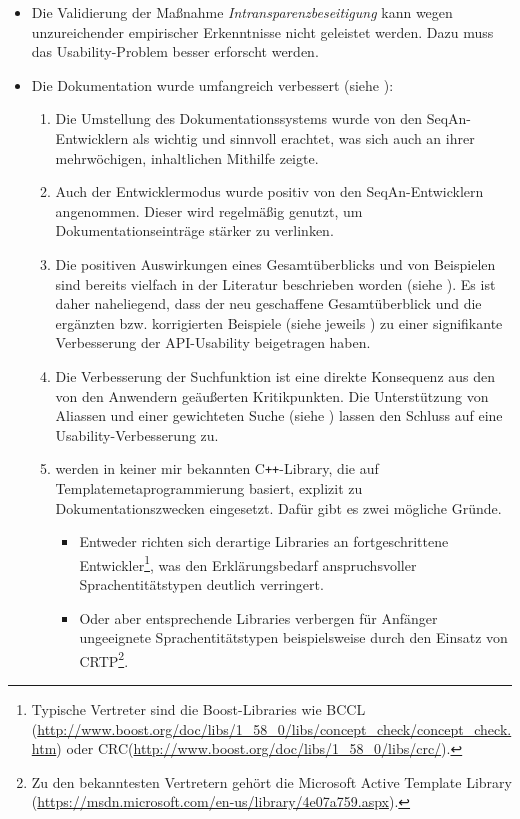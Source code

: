 \begin{itemize}
\begin{enumerate}
  \end{enumerate}
  \item Die Validierung der Maßnahme \textit{Intransparenzbeseitigung} kann wegen unzureichender empirischer Erkenntnisse nicht geleistet werden. Dazu muss das Usability-Problem  besser erforscht werden.
  \item Die Dokumentation wurde umfangreich verbessert (siehe ):
  \begin{enumerate}
    \item Die Umstellung des Dokumentationssystems wurde von den SeqAn-Entwicklern als wichtig und sinnvoll erachtet, was sich auch an ihrer mehrwöchigen, inhaltlichen Mithilfe zeigte.
    \item Auch der Entwicklermodus wurde positiv von den SeqAn-Entwicklern angenommen. Dieser wird regelmäßig genutzt, um Dokumentationseinträge stärker zu verlinken.
    \item Die positiven Auswirkungen eines Gesamtüberblicks und von Beispielen sind bereits vielfach in der Literatur beschrieben worden (siehe ). Es ist daher naheliegend, dass der neu geschaffene Gesamtüberblick und die ergänzten bzw. korrigierten Beispiele (siehe jeweils ) zu einer signifikante Verbesserung der API-Usability beigetragen haben.
    \item Die Verbesserung der Suchfunktion ist eine direkte Konsequenz aus den von den Anwendern geäußerten Kritikpunkten. Die Unterstützung von Aliassen und einer gewichteten Suche (siehe  ) lassen den Schluss auf eine Usability-Verbesserung zu.
    \item {} werden in keiner mir bekannten C\texttt{++}-Library, die auf Templatemetaprogrammierung basiert, explizit zu Dokumentationszwecken eingesetzt. Dafür gibt es zwei mögliche Gründe.
    \begin{itemize}
      \item Entweder richten sich derartige Libraries an fortgeschrittene Entwickler\footnote{Typische Vertreter sind die Boost-Libraries wie BCCL (\url{http://www.boost.org/doc/libs/1_58_0/libs/concept_check/concept_check.htm}) oder CRC(\url{http://www.boost.org/doc/libs/1_58_0/libs/crc/}).}, was den Erklärungsbedarf anspruchsvoller Sprachentitätstypen deutlich verringert.
      \item Oder aber entsprechende Libraries verbergen für Anfänger ungeeignete Sprachentitätstypen beispielsweise durch den Einsatz von CRTP\footnote{Zu den bekanntesten Vertretern gehört die Microsoft Active Template Library (\url{https://msdn.microsoft.com/en-us/library/4e07a759.aspx}).}.

\end{itemize}
\end{enumerate}
\end{itemize}
